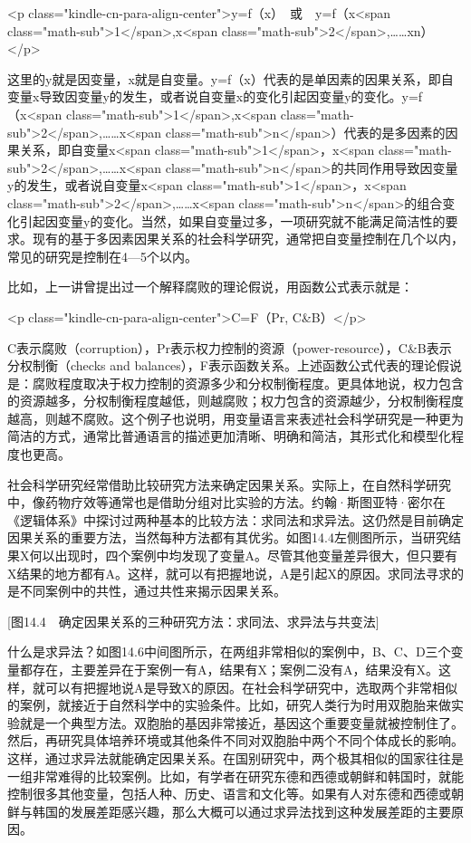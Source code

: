 <p class="kindle-cn-para-align-center">y=f（x）　或　y=f（x<span class="math-sub">1</span>,x<span class="math-sub">2</span>,……xn）</p>

这里的y就是因变量，x就是自变量。y=f（x）代表的是单因素的因果关系，即自变量x导致因变量y的发生，或者说自变量x的变化引起因变量y的变化。y=f（x<span class="math-sub">1</span>,x<span class="math-sub">2</span>,……x<span class="math-sub">n</span>）代表的是多因素的因果关系，即自变量x<span class="math-sub">1</span>，x<span class="math-sub">2</span>,……x<span class="math-sub">n</span>的共同作用导致因变量y的发生，或者说自变量x<span class="math-sub">1</span>，x<span class="math-sub">2</span>,……x<span class="math-sub">n</span>的组合变化引起因变量y的变化。当然，如果自变量过多，一项研究就不能满足简洁性的要求。现有的基于多因素因果关系的社会科学研究，通常把自变量控制在几个以内，常见的研究是控制在4—5个以内。

比如，上一讲曾提出过一个解释腐败的理论假说，用函数公式表示就是：

<p class="kindle-cn-para-align-center">C=F（Pr, C\&B）</p>

C表示腐败（corruption），Pr表示权力控制的资源（power-resource），C\&B表示分权制衡（checks and balances），F表示函数关系。上述函数公式代表的理论假说是：腐败程度取决于权力控制的资源多少和分权制衡程度。更具体地说，权力包含的资源越多，分权制衡程度越低，则越腐败；权力包含的资源越少，分权制衡程度越高，则越不腐败。这个例子也说明，用变量语言来表述社会科学研究是一种更为简洁的方式，通常比普通语言的描述更加清晰、明确和简洁，其形式化和模型化程度也更高。


社会科学研究经常借助比较研究方法来确定因果关系。实际上，在自然科学研究中，像药物疗效等通常也是借助分组对比实验的方法。约翰·斯图亚特·密尔在《逻辑体系》中探讨过两种基本的比较方法：求同法和求异法。这仍然是目前确定因果关系的重要方法，当然每种方法都有其优劣。如图14.4左侧图所示，当研究结果X何以出现时，四个案例中均发现了变量A。尽管其他变量差异很大，但只要有X结果的地方都有A。这样，就可以有把握地说，A是引起X的原因。求同法寻求的是不同案例中的共性，通过共性来揭示因果关系。

[图14.4　确定因果关系的三种研究方法：求同法、求异法与共变法]

什么是求异法？如图14.6中间图所示，在两组非常相似的案例中，B、C、D三个变量都存在，主要差异在于案例一有A，结果有X；案例二没有A，结果没有X。这样，就可以有把握地说A是导致X的原因。在社会科学研究中，选取两个非常相似的案例，就接近于自然科学中的实验条件。比如，研究人类行为时用双胞胎来做实验就是一个典型方法。双胞胎的基因非常接近，基因这个重要变量就被控制住了。然后，再研究具体培养环境或其他条件不同对双胞胎中两个不同个体成长的影响。这样，通过求异法就能确定因果关系。在国别研究中，两个极其相似的国家往往是一组非常难得的比较案例。比如，有学者在研究东德和西德或朝鲜和韩国时，就能控制很多其他变量，包括人种、历史、语言和文化等。如果有人对东德和西德或朝鲜与韩国的发展差距感兴趣，那么大概可以通过求异法找到这种发展差距的主要原因。

